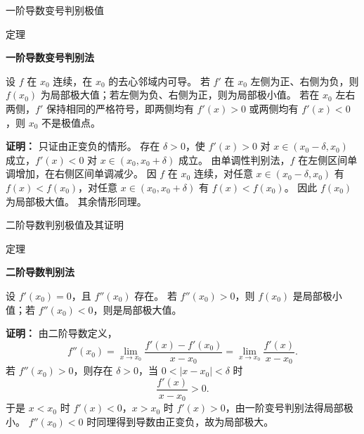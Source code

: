 \documentclass[aspectratio=169,10pt,fontset=fandol]{ctexbeamer}
\begin{document}
\begin{frame}[t,fragile]{一阶导数变号判别极值}
\normalsize
\begin{block}{定理}
{\normalsize
\textbf{一阶导数变号判别法}\par

设 $f$ 在 $x_0$ 连续，在 $x_0$ 的去心邻域内可导。 若 $f'$ 在 $x_0$ 左侧为正、右侧为负，则 $f(x_0)$ 为局部极大值；若左侧为负、右侧为正，则为局部极小值。 若在 $x_0$ 左右两侧，$f'$ 保持相同的严格符号，即两侧均有 $f'(x)>0$ 或两侧均有 $f'(x)<0$，则 $x_0$ 不是极值点。

}
\end{block}
\pause
{\normalsize
\textbf{证明：}
只证由正变负的情形。 存在 $\delta>0$，使 $f'(x)>0$ 对 $x\in(x_0-\delta,x_0)$ 成立，$f'(x)<0$ 对 $x\in(x_0,x_0+\delta)$ 成立。 由单调性判别法，$f$ 在左侧区间单调增加，在右侧区间单调减少。 因 $f$ 在 $x_0$ 连续，对任意 $x\in(x_0-\delta,x_0)$ 有 $f(x)<f(x_0)$，对任意 $x\in(x_0,x_0+\delta)$ 有 $f(x)<f(x_0)$。 因此 $f(x_0)$ 为局部极大值。 其余情形同理。

}
\end{frame}
\begin{frame}[t,fragile]{二阶导数判别极值及其证明}
\normalsize
\begin{block}{定理}
{\normalsize
\textbf{二阶导数判别法}\par

设 $f'(x_0)=0$，且 $f''(x_0)$ 存在。 若 $f''(x_0)>0$，则 $f(x_0)$ 是局部极小值；若 $f''(x_0)<0$，则是局部极大值。

}
\end{block}
\pause
{\normalsize
\textbf{证明：}
由二阶导数定义，
\[
f''(x_0)=\lim_{x\to x_0}\frac{f'(x)-f'(x_0)}{x-x_0}
=\lim_{x\to x_0}\frac{f'(x)}{x-x_0}.
\]
若 $f''(x_0)>0$，则存在 $\delta>0$，当 $0<|x-x_0|<\delta$ 时
\[
\frac{f'(x)}{x-x_0}>0.
\]
于是 $x<x_0$ 时 $f'(x)<0$，$x>x_0$ 时 $f'(x)>0$，由一阶变号判别法得局部极小。 $f''(x_0)<0$ 时同理得到导数由正变负，故为局部极大。

}
\end{frame}
\end{document}
